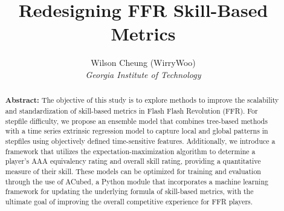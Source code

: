 \documentclass[10pt,a4paper]{scrartcl}
\begin{document}
\title{Redesigning FFR Skill-Based Metrics}
\author{Wilson Cheung (WirryWoo)\\
\textit{Georgia Institute of Technology}}
\date{\vspace{-3ex}}

\maketitle %




\begin{abstract}
	\normalsize
	\textbf{Abstract:} The objective of this study is to explore methods to improve the scalability and standardization of skill-based metrics in Flash Flash Revolution (FFR). For stepfile difficulty, we propose an ensemble model that combines tree-based methods with a time series extrinsic regression model to capture local and global patterns in stepfiles using objectively defined time-sensitive features. Additionally, we introduce a framework that utilizes the expectation-maximization algorithm to determine a player's AAA equivalency rating and overall skill rating, providing a quantitative measure of their skill. These models can be optimized for training and evaluation through the use of ACubed, a Python module that incorporates a machine learning framework for updating the underlying formula of skill-based metrics, with the ultimate goal of improving the overall competitive experience for FFR players.
\end{abstract}

\setcounter{tocdepth}{2}
\tableofcontents


\clearpage








\clearpage




\printbibliography
\end{document}
